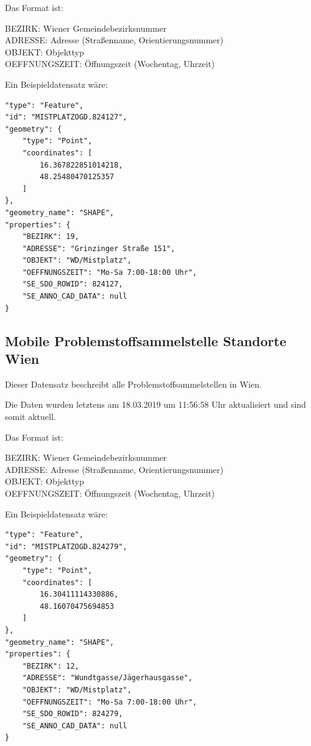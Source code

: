 \documentclass[12pt, a4paper]{scrreprt}
\begin{document}
    Das Format ist:
    \begin{tcolorbox}
        BEZIRK: Wiener Gemeindebezirksnummer\\
        ADRESSE: Adresse (Straßenname, Orientierungsnummer)\\
        OBJEKT: Objekttyp\\
        OEFFNUNGSZEIT: Öffnungszeit (Wochentag, Uhrzeit)
    \end{tcolorbox}
    
    Ein Beispieldatensatz wäre:
    \begin{lstlisting}
"type": "Feature",
"id": "MISTPLATZOGD.824127",
"geometry": {
    "type": "Point",
    "coordinates": [
        16.367822851014218,
        48.25480470125357
    ]
},
"geometry_name": "SHAPE",
"properties": {
    "BEZIRK": 19,
    "ADRESSE": "Grinzinger Straße 151",
    "OBJEKT": "WD/Mistplatz",
    "OEFFNUNGSZEIT": "Mo-Sa 7:00-18:00 Uhr",
    "SE_SDO_ROWID": 824127,
    "SE_ANNO_CAD_DATA": null
}
    \end{lstlisting}
\subsection{Mobile Problemstoffsammelstelle Standorte Wien \cite{mobileProblemstoffsmst}}
    Dieser Datensatz beschreibt alle Problemstoffsammelstellen in Wien.

    Die Daten wurden letztens am 18.03.2019 um 11:56:58 Uhr aktualisiert und sind somit aktuell.

    Das Format ist:
    \begin{tcolorbox}
        BEZIRK: Wiener Gemeindebezirksnummer\\
        ADRESSE: Adresse (Straßenname, Orientierungsnummer)\\
        OBJEKT: Objekttyp\\
        OEFFNUNGSZEIT: Öffnungszeit (Wochentag, Uhrzeit) 
    \end{tcolorbox}
    
    Ein Beispieldatensatz wäre:
    \begin{lstlisting}
"type": "Feature",
"id": "MISTPLATZOGD.824279",
"geometry": {
    "type": "Point",
    "coordinates": [
        16.30411114330886,
        48.16070475694853
    ]
},
"geometry_name": "SHAPE",
"properties": {
    "BEZIRK": 12,
    "ADRESSE": "Wundtgasse/Jägerhausgasse",
    "OBJEKT": "WD/Mistplatz",
    "OEFFNUNGSZEIT": "Mo-Sa 7:00-18:00 Uhr",
    "SE_SDO_ROWID": 824279,
    "SE_ANNO_CAD_DATA": null
}
    \end{lstlisting}
\end{document}
